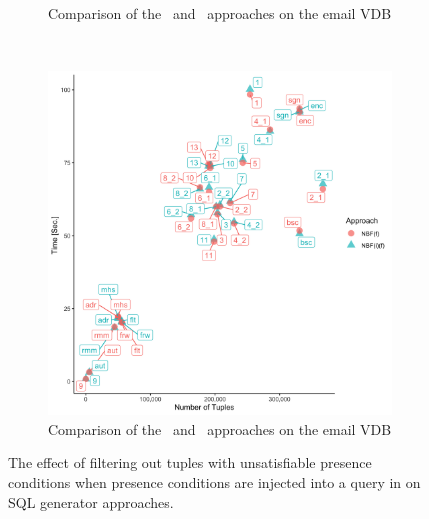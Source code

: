 \begin{figure}[t!]
\begin{subfigure}[t]{0.5\textwidth}
        \caption[Comparison of the \nbff\ and \nbfif\ approaches on the email VDB]{Comparison of the \nbff\ and \nbfif\ approaches on the email VDB}
    \end{subfigure}%
    ~ 
    \begin{subfigure}[t]{0.5\textwidth}
        \centering
        \includegraphics[scale=0.07]{figs/plots/enron-nbf-f-scatter.png}
        \caption[Comparison of the \nbff\ and \nbfif\ approaches on the email VDB]{Comparison of the \nbff\ and \nbfif\ approaches on the email VDB}
    \end{subfigure}
    \caption[The effect of filtering out tuples with unsatisfiable presence conditions when presence conditions are injected into a query in SQL generator approaches]{The effect of filtering out tuples with unsatisfiable presence conditions when presence conditions are injected into a query in  on SQL generator approaches.}
    \label{fig:filter-comp}
\end{figure}